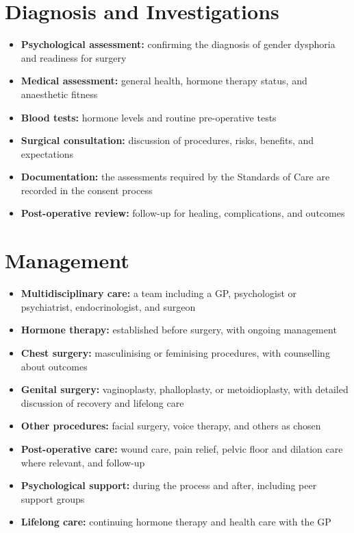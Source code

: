 \section*{Diagnosis and Investigations}
\begin{itemize}
    \item \textbf{Psychological assessment:} confirming the diagnosis of gender dysphoria and readiness for surgery
    \item \textbf{Medical assessment:} general health, hormone therapy status, and anaesthetic fitness
    \item \textbf{Blood tests:} hormone levels and routine pre-operative tests
    \item \textbf{Surgical consultation:} discussion of procedures, risks, benefits, and expectations
    \item \textbf{Documentation:} the assessments required by the Standards of Care are recorded in the consent process
    \item \textbf{Post-operative review:} follow-up for healing, complications, and outcomes
\end{itemize}

\section*{Management}
\begin{itemize}
    \item \textbf{Multidisciplinary care:} a team including a GP, psychologist or psychiatrist, endocrinologist, and surgeon
    \item \textbf{Hormone therapy:} established before surgery, with ongoing management
    \item \textbf{Chest surgery:} masculinising or feminising procedures, with counselling about outcomes
    \item \textbf{Genital surgery:} vaginoplasty, phalloplasty, or metoidioplasty, with detailed discussion of recovery and lifelong care
    \item \textbf{Other procedures:} facial surgery, voice therapy, and others as chosen
    \item \textbf{Post-operative care:} wound care, pain relief, pelvic floor and dilation care where relevant, and follow-up
    \item \textbf{Psychological support:} during the process and after, including peer support groups
    \item \textbf{Lifelong care:} continuing hormone therapy and health care with the GP
\end{itemize}

